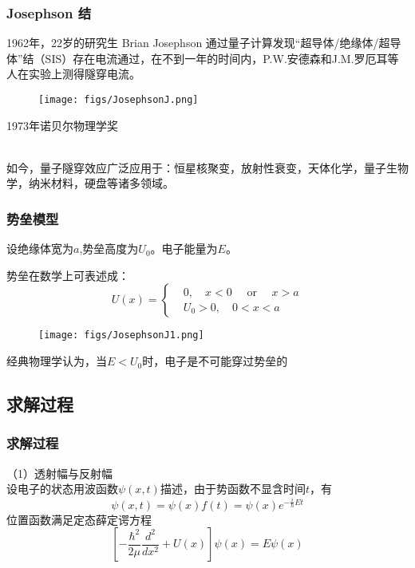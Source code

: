 \begin{frame}
  \frametitle{ Josephson 结}
  1962年，22岁的研究生 Brian Josephson 通过量子计算发现“超导体/绝缘体/超导体”结（SIS）存在电流通过，在不到一年的时间内，P.W.安德森和J.M.罗厄耳等人在实验上测得隧穿电流。
\begin{figure}[htbp]
    \centering
    \texttt{[image: figs/JosephsonJ.png]}
\end{figure}
1973年诺贝尔物理学奖

~~\\ 
如今，量子隧穿效应广泛应用于：恒星核聚变，放射性衰变，天体化学，量子生物学，纳米材料，硬盘等诸多领域。
\end{frame} 

\begin{frame}
  \frametitle{势垒模型}
设绝缘体宽为$a$,势垒高度为$U_0$。电子能量为$E$。 \\
\begin{minipage}[b]{0.49\textwidth}
    \vspace{0.3em}
    势垒在数学上可表述成：  
    $$
    U(x)=\left\{\begin{aligned}
    &0, \quad x<0 \quad \text { or } \quad x>a \\
    &U_0>0, \quad 0<x<a
    \end{aligned}\right.
    $$
    \vspace{2em}
  \end{minipage}
  \begin{minipage}[b]{0.49\textwidth}
 \begin{figure}[h]
    \centering
    \texttt{[image: figs/JosephsonJ1.png]}
\end{figure} 
  \end{minipage}
  经典物理学认为，当$E < U_0 $时，电子是不可能穿过势垒的
\end{frame} 

\subsection{求解过程}
\begin{frame}
  \frametitle{求解过程}
（1）透射幅与反射幅 \\
设电子的状态用波函数$\psi(x,t)$描述，由于势函数不显含时间$t$，有
$$ \psi(x,t) = \psi(x)f(t) = \psi(x) e^{-\frac{i}{\hbar}Et} $$
位置函数满足定态薛定谔方程
$$
	\left[-\dfrac{\hbar^2}{2\mu } \frac{d^2 }{d x^2}+U(x)\right]\psi(x) = E \psi(x)
	$$  
\end{frame} 

